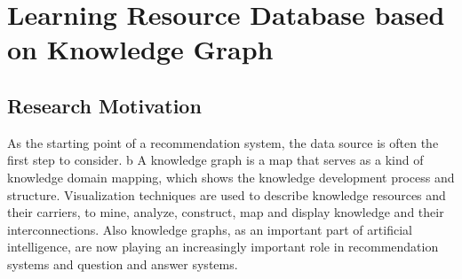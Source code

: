 
\chapter{Learning Resource Database based on Knowledge Graph}

\ifpdf
    \graphicspath{{Chapter2/Figs/Raster/}{Chapter2/Figs/PDF/}{Chapter2/Figs/}}
\else
    \graphicspath{{Chapter2/Figs/Vector/}{Chapter2/Figs/}}
\fi


\section{Research Motivation}




As the starting point of a recommendation system, the data source is often the first step to consider.
b
A knowledge graph is a map that serves as a kind of knowledge domain mapping, which shows the knowledge development process and structure. Visualization techniques are used to describe knowledge resources and their carriers, to mine, analyze, construct, map and display knowledge and their interconnections. Also knowledge graphs, as an important part of artificial intelligence, are now playing an increasingly important role in recommendation systems and question and answer systems.

